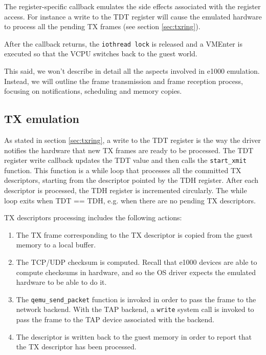 The register-specific callback emulates the side effects associated with the register access. For instance a write to the TDT
register will cause the emulated hardware to process all the pending TX frames (see section \ref{sec:txring}).

After the callback returns, the \texttt{iothread lock} is released and a VMEnter is executed so that the VCPU switches back to the 
guest world.

\vspace{0.5cm}

This said, we won't describe in detail all the aspects involved in e1000 emulation. Instead, we will outline the frame
transmission and frame reception process, focusing on notifications, scheduling and memory copies.


\subsection{TX emulation}
\label{sec:e1000txemu}
As stated in section \ref{sec:txring}, a write to the TDT register is the way the driver notifies the hardware that new TX frames 
are ready to be processed.
The TDT register write callback updates the TDT value and then calls the \texttt{start\_xmit} function. This function is a while
loop that processes all the committed TX descriptors, starting from the descriptor pointed by the TDH register. After each
descriptor is processed, the TDH register is incremented circularly. The while loop exits when TDT == TDH, e.g. when there
are no pending TX descriptors.

\vspace{0.5cm}

TX descriptors processing includes the following actions:
\begin{enumerate}
    \item The TX frame corresponding to the TX descriptor is copied from the guest memory to a local buffer.
    
    \item The TCP/UDP checksum is computed. Recall that e1000 devices are able to compute checksums in hardware, and so the OS 
	  driver expects the emulated hardware to be able to do it.
	  
    \item The \texttt{qemu\_send\_packet} function is invoked in order to pass the frame to the network backend. With the TAP backend,
	  a \texttt{write} system call is invoked to pass the frame to the TAP device associated with the backend.
	  
    \item The descriptor is written back to the guest memory in order to report that the TX descriptor has been processed.
\end{enumerate}

